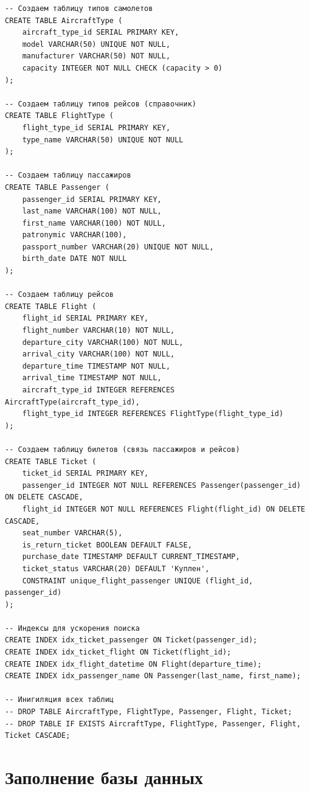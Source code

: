 \documentclass[a4paper,12pt]{article}
\begin{document}
\begin{verbatim}
-- Создаем таблицу типов самолетов
CREATE TABLE AircraftType (
    aircraft_type_id SERIAL PRIMARY KEY,
    model VARCHAR(50) UNIQUE NOT NULL,
    manufacturer VARCHAR(50) NOT NULL,
    capacity INTEGER NOT NULL CHECK (capacity > 0)
);

-- Создаем таблицу типов рейсов (справочник)
CREATE TABLE FlightType (
    flight_type_id SERIAL PRIMARY KEY,
    type_name VARCHAR(50) UNIQUE NOT NULL
);

-- Создаем таблицу пассажиров
CREATE TABLE Passenger (
    passenger_id SERIAL PRIMARY KEY,
    last_name VARCHAR(100) NOT NULL,
    first_name VARCHAR(100) NOT NULL,
    patronymic VARCHAR(100),
    passport_number VARCHAR(20) UNIQUE NOT NULL,
    birth_date DATE NOT NULL
);

-- Создаем таблицу рейсов
CREATE TABLE Flight (
    flight_id SERIAL PRIMARY KEY,
    flight_number VARCHAR(10) NOT NULL,
    departure_city VARCHAR(100) NOT NULL,
    arrival_city VARCHAR(100) NOT NULL,
    departure_time TIMESTAMP NOT NULL,
    arrival_time TIMESTAMP NOT NULL,
    aircraft_type_id INTEGER REFERENCES AircraftType(aircraft_type_id),
    flight_type_id INTEGER REFERENCES FlightType(flight_type_id)
);

-- Создаем таблицу билетов (связь пассажиров и рейсов)
CREATE TABLE Ticket (
    ticket_id SERIAL PRIMARY KEY,
    passenger_id INTEGER NOT NULL REFERENCES Passenger(passenger_id) ON DELETE CASCADE,
    flight_id INTEGER NOT NULL REFERENCES Flight(flight_id) ON DELETE CASCADE,
    seat_number VARCHAR(5),
    is_return_ticket BOOLEAN DEFAULT FALSE,
    purchase_date TIMESTAMP DEFAULT CURRENT_TIMESTAMP,
    ticket_status VARCHAR(20) DEFAULT 'Куплен',
    CONSTRAINT unique_flight_passenger UNIQUE (flight_id, passenger_id)
);

-- Индексы для ускорения поиска
CREATE INDEX idx_ticket_passenger ON Ticket(passenger_id);
CREATE INDEX idx_ticket_flight ON Ticket(flight_id);
CREATE INDEX idx_flight_datetime ON Flight(departure_time);
CREATE INDEX idx_passenger_name ON Passenger(last_name, first_name);

-- Инигиляция всех таблиц
-- DROP TABLE AircraftType, FlightType, Passenger, Flight, Ticket;
-- DROP TABLE IF EXISTS AircraftType, FlightType, Passenger, Flight, Ticket CASCADE;
\end{verbatim}

\section{Заполнение базы данных}
\end{document}
